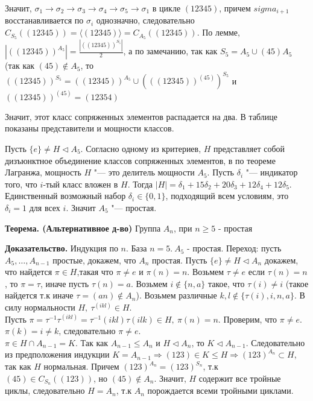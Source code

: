 \documentclass{article}
\begin{document}
Значит, $\sigma_1 \rightarrow \sigma_2 \rightarrow \sigma_3 \rightarrow \sigma_4 \rightarrow \sigma_5 \rightarrow \sigma_1$ в цикле $(1 2 3 4 5)$, причем $sigma_{i+1}$ восстанавливается по $\sigma_i$ однозначно, следовательно $C_{S_5}((1 2 3 4 5)) = \langle (1 2 3 4 5) \rangle = C_{A_5}((1 2 3 4 5))$. По лемме, $|((1 2 3 4 5))^{A_5}| = \frac{|((1 2 3 4 5))^{S_5}|}{2}$, а по замечанию, так как  $S_5 = A_5 \cup (4 5)A_5$ (так как $(4 5) \notin A_5$, то $((1 2 3 4 5))^{S_5} = ((1 2 3 4 5))^{A_5} \cup (((1 2 3 4 5))^{(4 5)})^{S_5}$ и $((1 2 3 4 5))^{(4 5)} = (1 2 3 5 4)$

Значит, этот класс сопряженных элементов распадается на два. В таблице показаны представители и мощности классов.

Пусть $\{e\} \neq H \triangleleft A_5$. Согласно одному из критериев, $H$ представляет собой дизъюнктное объединение классов сопряженных элементов, в по теореме Лагранжа, мощность $H$ "--- это делитель мощности $A_5$. Пусть $\delta_i$ "--- индикатор того, что $i$-тый класс вложен в $H$. Тогда $|H| = \delta_1 + 15\delta_2 + 20\delta_3 + 12\delta_4 + 12\delta_5$. Единственный возможный набор $\delta_i \in \{0, 1\}$, подходящий всем условиям, это $\delta_i = 1$ для всех $i$. Значит $A_5$ "--- простая.

\vspace{10pt}

\textbf{Теорема. (Альтернативное д-во)} Группа $A_n$, при $n \ge 5$ - простая
 
\textbf{Доказательство.}
Индукция по $n$. База $n=5.\ A_5$ - простая. Переход: пусть $A_5,\ldots,A_{n-1}$ простые, докажем, что $A_n$ простая. Пусть $\{e\}\neq H \triangleleft A_n$ докажем, что найдется $\pi\in H$,такая что $\pi\neq e$ и $\pi(n)= n$. Возьмем $\tau\neq e$ если $\tau(n)=n$, то $\pi=\tau$, иначе пусть $\tau(n)=a$. Возьмем $i\notin\{n,a\}$ такое, что $\tau(i)\neq i$ (такое найдется т.к иначе $\tau=(an)\notin A_n$). Возьмем различные $k,l\notin\{\tau(i),i,n,a\}$. В силу нормальности $H,\ \tau^{(ikl)}\in H$. \\Пусть
$\pi=\tau^{-1}\tau^{(ikl)}=\tau^{-1}(ikl)\tau(ilk)\in H,\ \pi(n)=n$.
Проверим, что $\pi\neq e$. $\pi(k)=i\neq k$, следовательно $\pi\neq e$.\\
$\pi\in H\cap A_{n-1} = K$. Так как $A_{n-1}\le A_n$ и $H \triangleleft A_n$, то $K \triangleleft A_{n-1}$. Следовательно из предположения индукции $K=A_{n-1} \Rightarrow (123)\in K \le H \Rightarrow (123)^{A_n} \subset H$, так как $H$ нормальная. Причем $(123)^{A_n}=(123)^{S_n}$, т.к $(45)\in C_{S_n}((123))$, но $(45)\notin A_n$. Значит, $H$ содержит все тройные циклы, следовательно $H = A_n$, т.к $A_n$ порождается всеми тройными циклами.
\end{document}
